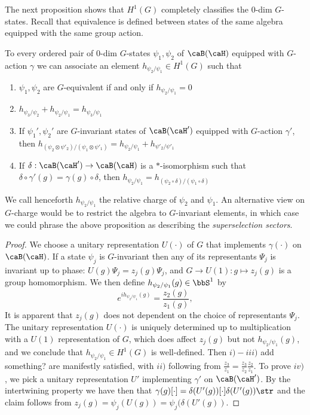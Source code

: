 The next proposition shows that $H^1(G)$ completely classifies the $0$-dim $G$-states. Recall that equivalence is defined between states of the same algebra equipped with the same group action. 
\begin{proposition}\label{prop: zerodim}
	To every ordered pair of $0$-dim $G$-states $\psi_1,\psi_2$ of $\caB(\caH)$ equipped with $G$-action $\gamma$ we can associate an element $h_{\psi_2/\psi_1} \in H^1(G)$ such that 
	\begin{enumerate}
		\item $\psi_1,\psi_2$ are $G$-equivalent if and only if  $h_{\psi_2/\psi_1}=0$
		\item $h_{\psi_3/\psi_2}+h_{\psi_2/\psi_1}=h_{\psi_3/\psi_1}$
		\item If $\psi_1',\psi_2'$ are $G$-invariant states of $\caB(\caH')$ equipped with $G$-action $\gamma'$, then $h_{(\psi_2 \otimes \psi'_2)/(\psi_1 \otimes \psi'_1)}= h_{\psi_2/\psi_1}+ h_{\psi'_2/\psi'_1}$
		\item If $\delta:\caB(\caH')\to \caB(\caH) $ is a $*$-isomorphism such that $\delta\circ\gamma'(g)=\gamma(g)\circ\delta$, then $h_{\psi_2/\psi_1}= h_{(\psi_2\circ\delta)/(\psi_1\circ\delta)}$
	\end{enumerate} 
\end{proposition}
We call henceforth $h_{\psi_2/\psi_1}$ the relative charge of $\psi_2$ and $\psi_1$. 
An alternative view on $G$-charge would be to restrict the algebra to $G$-invariant elements, in which case we could phrase the above proposition as describing the \emph{superselection sectors}.
\begin{proof}
	We choose a unitary representation $U(\cdot)$ of $G$ that implements $\gamma(\cdot)$ on $\caB(\caH)$.  
	If a state $\psi_j$ is $G$-invariant then any of its representants $\Psi_j$ is invariant up to phase: $U(g)\Psi_j= z_j(g)\Psi_j$, and $G\to U(1): g\mapsto z_j(g)$ is a group homomorphism. We then define $h_{\psi_2/\psi_1}(g)\in\bbS^1$ by
	$$
	e^{ih_{\psi_2/\psi_1}(g)}=\frac{z_2(g)}{z_1(g)}, 
	$$ 
	It is apparent that $z_j(g)$ does not dependent on the choice of representants $\Psi_j$. The unitary representation $U(\cdot)$ is uniquely determined up to multiplication with a $U(1)$ representation of $G$, which does affect $z_j(g)$ but not $h_{\psi_2/\psi_1}(g)$, and we conclude that $h_{\psi_2/\psi_1} \in H^1(G)$ is well-defined.  Then $i)-iii)$ {\color{red} add something?} are manifestly satisfied, with $ii)$ following from $\frac{z_3}{z_1} = \frac{z_3}{z_2}\frac{z_2}{z_1}$. To prove $iv)$, we pick a unitary representation $U'$ implementing $\gamma'$ on  $\caB(\caH')$. By the intertwining property we have then that $\gamma(g)[\cdot]=\delta(U'(g))[\cdot]\delta(U'(g))\str$ and the claim follows from $z_j(g) = \psi_j(U(g)) = \psi_j(\delta(U'(g))$.
\end{proof}

